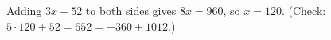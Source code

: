 Adding $3x-52$ to both sides gives $8x=960$, so $x=\boxed{120}$. (Check: $5\cdot120+52=652=-360+1012$.)
